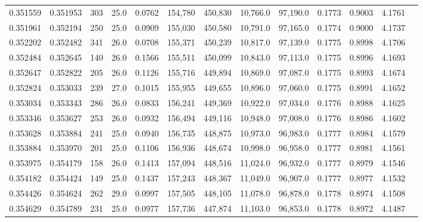 \begin{tabular}{rrrrrrrrrrrrr}
0.351559 & 0.351953 &   303 & 25.0 &                                     0.0762 & 154,780 & 450,830 &  10,766.0 &  97,190.0 & 0.1773 & 0.9003 & 4.1761 \\
0.351961 & 0.352194 &   250 & 25.0 &                                     0.0909 & 155,030 & 450,580 &  10,791.0 &  97,165.0 & 0.1774 & 0.9000 & 4.1737 \\
0.352202 & 0.352482 &   341 & 26.0 &                                     0.0708 & 155,371 & 450,239 &  10,817.0 &  97,139.0 & 0.1775 & 0.8998 & 4.1706 \\
0.352484 & 0.352645 &   140 & 26.0 &                                     0.1566 & 155,511 & 450,099 &  10,843.0 &  97,113.0 & 0.1775 & 0.8996 & 4.1693 \\
0.352647 & 0.352822 &   205 & 26.0 &                                     0.1126 & 155,716 & 449,894 &  10,869.0 &  97,087.0 & 0.1775 & 0.8993 & 4.1674 \\
0.352824 & 0.353033 &   239 & 27.0 &                                     0.1015 & 155,955 & 449,655 &  10,896.0 &  97,060.0 & 0.1775 & 0.8991 & 4.1652 \\
0.353034 & 0.353343 &   286 & 26.0 &                                     0.0833 & 156,241 & 449,369 &  10,922.0 &  97,034.0 & 0.1776 & 0.8988 & 4.1625 \\
0.353346 & 0.353627 &   253 & 26.0 &                                     0.0932 & 156,494 & 449,116 &  10,948.0 &  97,008.0 & 0.1776 & 0.8986 & 4.1602 \\
0.353628 & 0.353884 &   241 & 25.0 &                                     0.0940 & 156,735 & 448,875 &  10,973.0 &  96,983.0 & 0.1777 & 0.8984 & 4.1579 \\
0.353884 & 0.353970 &   201 & 25.0 &                                     0.1106 & 156,936 & 448,674 &  10,998.0 &  96,958.0 & 0.1777 & 0.8981 & 4.1561 \\
0.353975 & 0.354179 &   158 & 26.0 &                                     0.1413 & 157,094 & 448,516 &  11,024.0 &  96,932.0 & 0.1777 & 0.8979 & 4.1546 \\
0.354182 & 0.354424 &   149 & 25.0 &                                     0.1437 & 157,243 & 448,367 &  11,049.0 &  96,907.0 & 0.1777 & 0.8977 & 4.1532 \\
0.354426 & 0.354624 &   262 & 29.0 &                                     0.0997 & 157,505 & 448,105 &  11,078.0 &  96,878.0 & 0.1778 & 0.8974 & 4.1508 \\
0.354629 & 0.354789 &   231 & 25.0 &                                     0.0977 & 157,736 & 447,874 &  11,103.0 &  96,853.0 & 0.1778 & 0.8972 & 4.1487 \\

\end{tabular}
